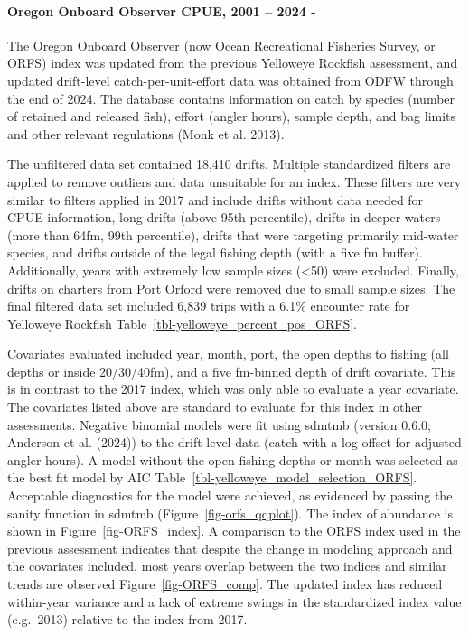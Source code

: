 \documentclass[
]{scrartcl}
\let\oldparagraph\paragraph
\renewcommand{\paragraph}[1]{\oldparagraph{#1}\mbox{}}
\begin{document}
\paragraph{Oregon Onboard Observer CPUE, 2001 -- 2024
-}\label{oregon-onboard-observer-cpue-2001-2024--}

The Oregon Onboard Observer (now Ocean Recreational Fisheries Survey, or
ORFS) index was updated from the previous Yelloweye Rockfish assessment,
and updated drift-level catch-per-unit-effort data was obtained from
ODFW through the end of 2024. The database contains information on catch
by species (number of retained and released fish), effort (angler
hours), sample depth, and bag limits and other relevant regulations
(Monk et al. 2013).

The unfiltered data set contained 18,410 drifts. Multiple standardized
filters are applied to remove outliers and data unsuitable for an index.
These filters are very similar to filters applied in 2017 and include
drifts without data needed for CPUE information, long drifts (above 95th
percentile), drifts in deeper waters (more than 64fm, 99th percentile),
drifts that were targeting primarily mid-water species, and drifts
outside of the legal fishing depth (with a five fm buffer).
Additionally, years with extremely low sample sizes (\textless50) were
excluded. Finally, drifts on charters from Port Orford were removed due
to small sample sizes. The final filtered data set included 6,839 trips
with a 6.1\% encounter rate for Yelloweye Rockfish
Table~\ref{tbl-yelloweye_percent_pos_ORFS}.

Covariates evaluated included year, month, port, the open depths to
fishing (all depths or inside 20/30/40fm), and a five fm-binned depth of
drift covariate. This is in contrast to the 2017 index, which was only
able to evaluate a year covariate. The covariates listed above are
standard to evaluate for this index in other assessments. Negative
binomial models were fit using \gls{sdmtmb} (version 0.6.0; Anderson et
al. (2024)) to the drift-level data (catch with a log offset for
adjusted angler hours). A model without the open fishing depths or month
was selected as the best fit model by AIC
Table~\ref{tbl-yelloweye_model_selection_ORFS}. Acceptable diagnostics
for the model were achieved, as evidenced by passing the sanity function
in \gls{sdmtmb} (Figure~\ref{fig-orfs_qqplot}). The index of abundance
is shown in Figure~\ref{fig-ORFS_index}. A comparison to the ORFS index
used in the previous assessment indicates that despite the change in
modeling approach and the covariates included, most years overlap
between the two indices and similar trends are observed
Figure~\ref{fig-ORFS_comp}. The updated index has reduced within-year
variance and a lack of extreme swings in the standardized index value
(e.g.~2013) relative to the index from 2017.
\end{document}
